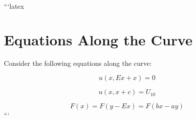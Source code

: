 ```latex
\section*{Equations Along the Curve}

Consider the following equations along the curve:

\begin{equation}
u(x, Ex + x) = 0
\end{equation}

\begin{equation}
u(x, x + c) = U_{10}
\end{equation}

\begin{equation}
F(x) = F(y - Ex) = F(bx - ay)
\end{equation}
```
